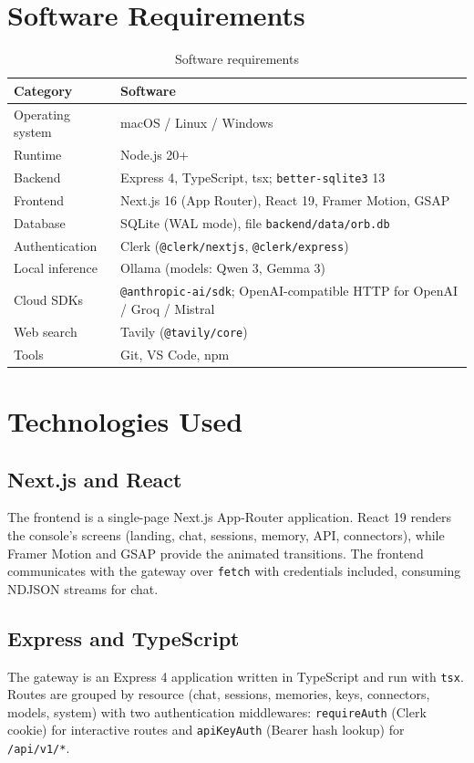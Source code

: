 \documentclass[12pt,a4paper,oneside]{report}
\begin{document}
\section{Software Requirements}
\begin{table}[h]
\caption{Software requirements}
\centering
\begin{tabular}{p{4.5cm}p{8.5cm}}
\toprule
\textbf{Category} & \textbf{Software} \\
\midrule
Operating system & macOS / Linux / Windows \\
Runtime & Node.js 20+ \\
Backend & Express 4, TypeScript, tsx; \texttt{better-sqlite3} 13 \\
Frontend & Next.js 16 (App Router), React 19, Framer Motion, GSAP \\
Database & SQLite (WAL mode), file \texttt{backend/data/orb.db} \\
Authentication & Clerk (\texttt{@clerk/nextjs}, \texttt{@clerk/express}) \\
Local inference & Ollama (models: Qwen 3, Gemma 3) \\
Cloud SDKs & \texttt{@anthropic-ai/sdk}; OpenAI-compatible HTTP for
             OpenAI / Groq / Mistral \\
Web search & Tavily (\texttt{@tavily/core}) \\
Tools & Git, VS Code, npm \\
\bottomrule
\end{tabular}
\end{table}

\section{Technologies Used}

\subsection{Next.js and React}
The frontend is a single-page Next.js App-Router application. React 19
renders the console's screens (landing, chat, sessions, memory, API,
connectors), while Framer Motion and GSAP provide the animated
transitions. The frontend communicates with the gateway over
\texttt{fetch} with credentials included, consuming NDJSON streams for
chat.

\subsection{Express and TypeScript}
The gateway is an Express 4 application written in TypeScript and run
with \texttt{tsx}. Routes are grouped by resource (chat, sessions,
memories, keys, connectors, models, system) with two authentication
middlewares: \texttt{requireAuth} (Clerk cookie) for interactive
routes and \texttt{apiKeyAuth} (Bearer hash lookup) for
\texttt{/api/v1/*}.
\end{document}
